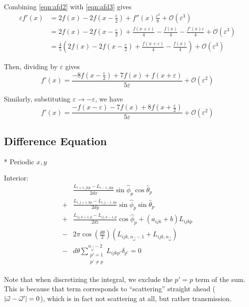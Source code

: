 Combining \eqref{eqn:afd2} with \eqref{eqn:afd3} gives
\begin{align*}
  \varepsilon f'(x) &= 2f(x) - 2f(x-\frac{\varepsilon}{2}) + f''(x)\frac{\varepsilon^2}{8} + \mathcal{O}(\varepsilon^3) \\
                    &= 2f(x) - 2f(x-\frac{\varepsilon}{2}) + \frac{f(x+\varepsilon)}{4} - \frac{f(x)}{4} - \frac{f'(x)\varepsilon}{4} + \mathcal{O}(\varepsilon^3) \\
                    &= \frac{4}{5}\left( 2f(x)-2f(x-\frac{\varepsilon}{2}) + \frac{f(x+\varepsilon)}{4} - \frac{f(x)}{4} \right) + \mathcal{O}(\varepsilon^3)
\end{align*}

Then, dividing by $\varepsilon$ gives
\begin{equation}
  f'(x) = \frac{-8f(x-\frac{\varepsilon}{2}) + 7f(x) + f(x+\varepsilon)}{5\varepsilon} + \mathcal{O}(\varepsilon^2)
\end{equation}

Similarly, substituting $\varepsilon \to -\varepsilon$, we have 
\begin{equation}
  f'(x) = \frac{- f(x-\varepsilon) - 7f(x) + 8f(x+\frac{\varepsilon}{2})}{5\varepsilon} + \mathcal{O}(\varepsilon^2)
\end{equation}


\subsection{Difference Equation}

* Periodic $x,y$

Interior:
\begin{equation}
  \begin{aligned}
    &\frac{L_{i+1,jkp}-L_{i-1,jkp}}{2dx}\sin\hat{\phi}_p\cos\hat{\theta}_p \\
    + &\frac{L_{i,j+1,kp}-L_{i,j-1,kp}}{2dy}\sin\hat{\phi}_p\sin\hat{\theta}_p \\
    + &\frac{L_{ij,k+1,p}-L_{ij,k-1,p}}{2dz}\cos\hat{\phi}_p + (a_{ijk}+b)L_{ijkp} \\
    - &2\pi\cos\left( \frac{d\theta}{2} \right)(L_{ijk,n_{\vec{\omega}}-1}+L_{ijk,n_{\vec{\omega}}}) \\
    - &d\theta \sum_{\substack{p'=1 \\ p' \neq p}}^{n_{\vec{\omega}}-2} L_{ijkp'}\delta_{p'} = 0
  \end{aligned}
\end{equation}

Note that when discretizing the integral, we exclude the $p'=p$ term of the sum.
This is because that term corresponds to ``scattering'' straight ahead
($\left| \vec{\omega}-\vec{\omega}' \right|=0$), which is in fact not scattering at all,
but rather transmission.


